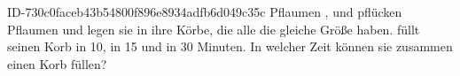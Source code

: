 \begin{exercise}
      {ID-730c0faceb43b54800f896e8934adfb6d049c35c}
      {Pflaumen}
  \ifproblem\problem
    \xya, \xxb{} und \xxc{} pflücken Pflaumen und legen sie in ihre Körbe, die
    alle die gleiche Größe haben. \xya{} füllt seinen Korb in 10, \xxb{} in 15
    und \xxc{} in 30 Minuten. In welcher Zeit können sie zusammen einen Korb
    füllen?
  \fi
\end{exercise}

